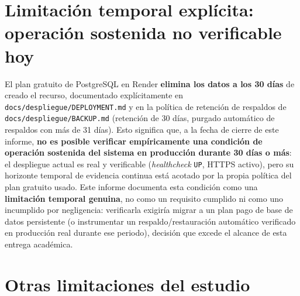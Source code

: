 \section{Limitaci\'on temporal expl\'icita: operaci\'on sostenida no verificable hoy}
\label{sec:limitacion-30-dias}

El plan gratuito de PostgreSQL en Render \textbf{elimina los datos a los 30
d\'ias} de creado el recurso, documentado expl\'icitamente en
\texttt{docs/despliegue/DEPLOYMENT.md} y en la pol\'itica de retenci\'on de
respaldos de \texttt{docs/despliegue/BACKUP.md} (retenci\'on de 30 d\'ias,
purgado autom\'atico de respaldos con m\'as de 31 d\'ias). Esto significa
que, a la fecha de cierre de este informe, \textbf{no es posible verificar
emp\'iricamente una condici\'on de operaci\'on sostenida del sistema en
producci\'on durante 30 d\'ias o m\'as}: el despliegue actual es real y
verificable (\emph{healthcheck} \texttt{UP}, HTTPS activo), pero su
horizonte temporal de evidencia continua est\'a acotado por la propia
pol\'itica del plan gratuito usado. Este informe documenta esta condici\'on
como una \textbf{limitaci\'on temporal genuina}, no como un requisito
cumplido ni como uno incumplido por negligencia: verificarla exigir\'ia
migrar a un plan pago de base de datos persistente (o instrumentar un
respaldo/restauraci\'on autom\'atico verificado en producci\'on real durante
ese periodo), decisi\'on que excede el alcance de esta entrega acad\'emica.

\section{Otras limitaciones del estudio}

